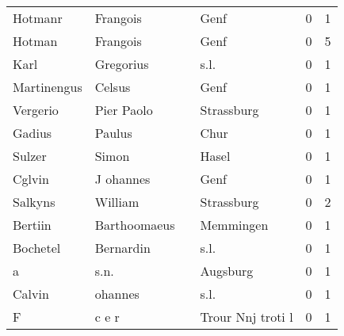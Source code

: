 \begin{center}
\begin{tiny}
\begin{longtabu}{llllrr}
                  Hotmanr &                           Frangois &             &                                        Genf &          0 &         1 \\
                   Hotman &                           Frangois &             &                                        Genf &          0 &         5 \\
                     Karl &                          Gregorius &             &                                        s.l. &          0 &         1 \\
              Martinengus &                             Celsus &             &                                        Genf &          0 &         1 \\
                 Vergerio &                         Pier Paolo &             &                                  Strassburg &          0 &         1 \\
                   Gadius &                             Paulus &             &                                        Chur &          0 &         1 \\
                   Sulzer &                              Simon &             &                                       Hasel &          0 &         1 \\
                   Cglvin &                          J ohannes &             &                                        Genf &          0 &         1 \\
                  Salkyns &                            William &             &                                  Strassburg &          0 &         2 \\
                  Bertiin &                       Barthoomaeus &             &                                   Memmingen &          0 &         1 \\
                 Bochetel &                          Bernardin &             &                                        s.l. &          0 &         1 \\
                        a &                               s.n. &             &                                    Augsburg &          0 &         1 \\
                   Calvin &                            ohannes &             &                                        s.l. &          0 &         1 \\
                        F &                              c e r &             &                           Trour Nnj troti l &          0 &         1 \\

\end{longtabu}
\end{tiny}
\end{center}
